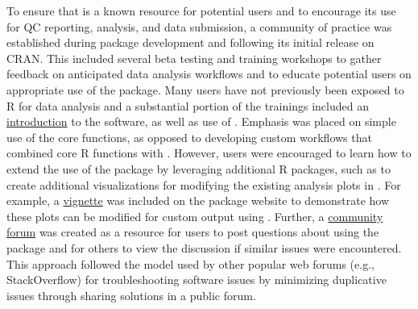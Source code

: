 To ensure that  is a known resource for potential users and to encourage its use for QC reporting, analysis, and data submission, a community of practice was established during package development and following its initial release on CRAN. This included several beta testing and training workshops to gather feedback on anticipated data analysis workflows and to educate potential users on appropriate use of the package. Many users have not previously been exposed to R for data analysis and a substantial portion of the trainings included an \href{https://massbays-tech.github.io/intro-to-r/}{introduction} to the software, as well as use of . Emphasis was placed on simple use of the core functions, as opposed to developing custom workflows that combined core R functions with . However, users were encouraged to learn how to extend the use of the package by leveraging additional R packages, such as  to create additional visualizations for modifying the existing analysis plots in . For example, a \href{https://massbays-tech.github.io/MassWateR/articles/modifying.html}{vignette} was included on the package website to demonstrate how these plots can be modified for custom output using . Further, a \href{https://massbays.discourse.group/c/masswater-r-tools/5}{community forum} was created as a resource for users to post questions about using the package and for others to view the discussion if similar issues were encountered. This approach followed the model used by other popular web forums (e.g., StackOverflow) for troubleshooting software issues by minimizing duplicative issues through sharing solutions in a public forum.

